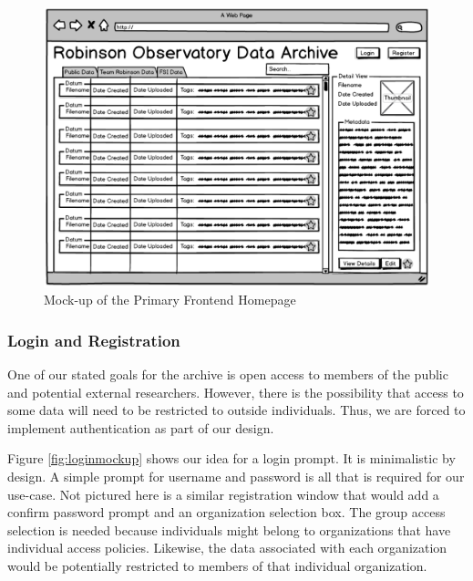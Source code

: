 \documentclass[12pt]{report}
\begin{document}
\begin{figure}[h]
	\centering
	\includegraphics[width=\linewidth]{frontend_mockup}
	\caption{Mock-up of the Primary Frontend Homepage}
	\label{fig:frontendmockup}
\end{figure}

\subsubsection*{Login and Registration}

One of our stated goals for the archive is open access to members of the public and potential external researchers. However, there is the possibility that access to some data will need to be restricted to outside individuals. Thus, we are forced to implement authentication as part of our design.

Figure \ref{fig:loginmockup} shows our idea for a login prompt. It is minimalistic by design. A simple prompt for username and password is all that is required for our use-case. Not pictured here is a similar registration window that would add a confirm password prompt and an organization selection box. The group access selection is needed because individuals might belong to organizations that have individual access policies. Likewise, the data associated with each organization would be potentially restricted to members of that individual organization.
\end{document}
